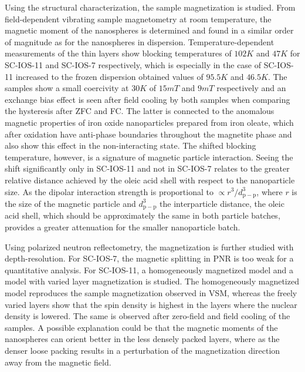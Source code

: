 \documentclass[\main/dresen_thesis.tex]{subfiles}
\begin{document}
  Using the structural characterization, the sample magnetization is studied.
  From field-dependent vibrating sample magnetometry at room temperature, the magnetic moment of the nanospheres is determined and found in a similar order of magnitude as for the nanospheres in dispersion.
  Temperature-dependent measurements of the thin layers show blocking temperatures of $102 \unit{K}$ and $47 \unit{K}$ for SC-IOS-11 and SC-IOS-7 respectively, which is especially in the case of SC-IOS-11 increased to the frozen dispersion obtained values of $95.5 \unit{K}$ and $46.5 \unit{K}$.
  The samples show a small coercivity at $30 \unit{K}$ of $15 \unit{mT}$ and $9 \unit{mT}$ respectively and an exchange bias effect is seen after field cooling by both samples when comparing the hysteresis after ZFC and FC.
  The latter is connected to the anomalous magnetic properties of iron oxide nanoparticles prepared from iron oleate, which after oxidation have anti-phase boundaries throughout the magnetite phase and also show this effect in the non-interacting state.
  The shifted blocking temperature, however, is a signature of magnetic particle interaction.
  Seeing the shift significantly only in SC-IOS-11 and not in SC-IOS-7 relates to the greater relative distance achieved by the oleic acid shell with respect to the nanoparticle size.
  As the dipolar interaction strength is proportional to $\propto r^3 / d_\mathrm{p-p}^3$, where $r$ is the size of the magnetic particle and $d_\mathrm{p-p}^3$ the interparticle distance, the oleic acid shell, which should be approximately the same in both particle batches, provides a greater attenuation for the smaller nanoparticle batch.

  Using polarized neutron reflectometry, the magnetization is further studied with depth-resolution.
  For SC-IOS-7, the magnetic splitting in PNR is too weak for a quantitative analysis.
  For SC-IOS-11, a homogeneously magnetized model and a model with varied layer magnetization is studied.
  The homogeneously magnetized model reproduces the sample magnetization observed in VSM, whereas the freely varied layers show that the spin density is highest in the layers where the nuclear density is lowered.
  The same is observed after zero-field and field cooling of the samples.
  A possible explanation could be that the magnetic moments of the nanospheres can orient better in the less densely packed layers, where as the denser loose packing results in a perturbation of the magnetization direction away from the magnetic field.
\end{document}
